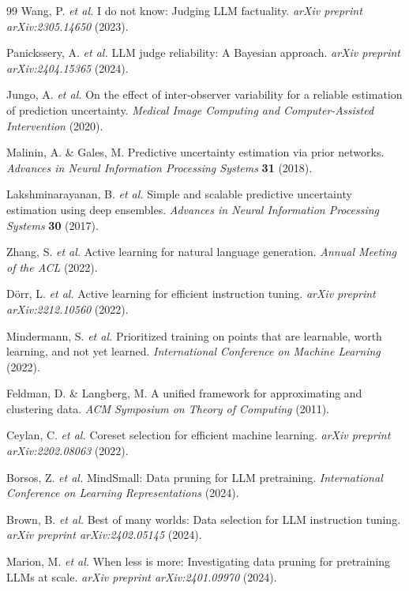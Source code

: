\documentclass[11pt,twocolumn]{article}
\begin{document}
\begin{thebibliography}{99}
Wang, P. \textit{et al.} I do not know: Judging LLM factuality. \textit{arXiv preprint arXiv:2305.14650} (2023).

Panickssery, A. \textit{et al.} LLM judge reliability: A Bayesian approach. \textit{arXiv preprint arXiv:2404.15365} (2024).

Jungo, A. \textit{et al.} On the effect of inter-observer variability for a reliable estimation of prediction uncertainty. \textit{Medical Image Computing and Computer-Assisted Intervention} (2020).

Malinin, A. \& Gales, M. Predictive uncertainty estimation via prior networks. \textit{Advances in Neural Information Processing Systems} \textbf{31} (2018).

Lakshminarayanan, B. \textit{et al.} Simple and scalable predictive uncertainty estimation using deep ensembles. \textit{Advances in Neural Information Processing Systems} \textbf{30} (2017).

Zhang, S. \textit{et al.} Active learning for natural language generation. \textit{Annual Meeting of the ACL} (2022).

D\"orr, L. \textit{et al.} Active learning for efficient instruction tuning. \textit{arXiv preprint arXiv:2212.10560} (2022).

Mindermann, S. \textit{et al.} Prioritized training on points that are learnable, worth learning, and not yet learned. \textit{International Conference on Machine Learning} (2022).

Feldman, D. \& Langberg, M. A unified framework for approximating and clustering data. \textit{ACM Symposium on Theory of Computing} (2011).

Ceylan, C. \textit{et al.} Coreset selection for efficient machine learning. \textit{arXiv preprint arXiv:2202.08063} (2022).

Borsos, Z. \textit{et al.} MindSmall: Data pruning for LLM pretraining. \textit{International Conference on Learning Representations} (2024).

Brown, B. \textit{et al.} Best of many worlds: Data selection for LLM instruction tuning. \textit{arXiv preprint arXiv:2402.05145} (2024).

Marion, M. \textit{et al.} When less is more: Investigating data pruning for pretraining LLMs at scale. \textit{arXiv preprint arXiv:2401.09970} (2024).

\end{thebibliography}
\end{document}

